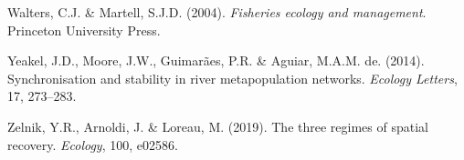 \documentclass[
]{article}
\newlength{\cslhangindent}
\newlength{\cslentryspacingunit} %
\newenvironment{CSLReferences}[2] %
 {%
  \setlength{\parindent}{0pt}
  \ifodd #1
  \let\oldpar\par
  \def\par{\hangindent=\cslhangindent\oldpar}
  \fi
  \setlength{\parskip}{#2\cslentryspacingunit}
 }%
 {}
\begin{document}
\begin{CSLReferences}{1}{0}
\leavevmode{}%
Walters, C.J. \& Martell, S.J.D. (2004). \emph{{Fisheries ecology and
management}}. Princeton University Press.

\leavevmode{}%
Yeakel, J.D., Moore, J.W., Guimarães, P.R. \& Aguiar, M.A.M. de. (2014).
{Synchronisation and stability in river metapopulation networks}.
\emph{Ecology Letters}, 17, 273--283.

\leavevmode{}%
Zelnik, Y.R., Arnoldi, J. \& Loreau, M. (2019). {The three regimes of
spatial recovery}. \emph{Ecology}, 100, e02586.

\end{CSLReferences}
\end{document}
